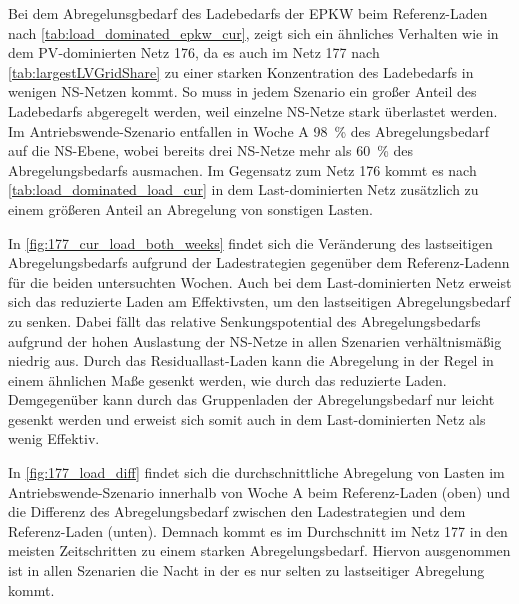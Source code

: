 



Bei dem Abregelunsgbedarf des Ladebedarfs der \gls{EPKW} beim Referenz-Laden nach \autoref{tab:load_dominated_epkw_cur}, zeigt sich ein ähnliches Verhalten wie in dem \gls{PV}-dominierten Netz \num{176}, da es auch im Netz \num{177} nach \autoref{tab:largestLVGridShare} zu einer starken Konzentration des Ladebedarfs in wenigen \gls{NS}-Netzen kommt.
So muss in jedem Szenario ein großer Anteil des Ladebedarfs abgeregelt werden, weil einzelne \gls{NS}-Netze stark überlastet werden.
Im Antriebswende-Szenario entfallen in Woche A \SI{98}{\percent} des Abregelungsbedarf auf die \gls{NS}-Ebene, wobei bereits drei \gls{NS}-Netze mehr als \SI{60}{\percent} des Abregelungsbedarfs ausmachen.
Im Gegensatz zum Netz \num{176} kommt es nach \autoref{tab:load_dominated_load_cur} in dem Last-dominierten Netz zusätzlich zu einem größeren Anteil an Abregelung von sonstigen Lasten.





In \autoref{fig:177_cur_load_both_weeks} findet sich die Veränderung des lastseitigen Abregelungsbedarfs aufgrund der Ladestrategien gegenüber dem Referenz-Ladenn für die beiden untersuchten Wochen.
Auch bei dem Last-dominierten Netz erweist sich das reduzierte Laden am Effektivsten, um den lastseitigen Abregelungsbedarf zu senken.
Dabei fällt das relative Senkungspotential des Abregelungsbedarfs aufgrund der hohen Auslastung der \gls{NS}-Netze in allen Szenarien verhältnismäßig niedrig aus.
Durch das Residuallast-Laden kann die Abregelung in der Regel in einem ähnlichen Maße gesenkt werden, wie durch das reduzierte Laden.
Demgegenüber kann durch das Gruppenladen der Abregelungsbedarf nur leicht gesenkt werden und erweist sich somit auch in dem Last-dominierten Netz als wenig Effektiv.



In \autoref{fig:177_load_diff} findet sich die durchschnittliche Abregelung von Lasten im Antriebswende-Szenario innerhalb von Woche A beim Referenz-Laden (oben) und die Differenz des Abregelungsbedarf zwischen den Ladestrategien und dem Referenz-Laden (unten).
Demnach kommt es im Durchschnitt im Netz \num{177} in den meisten Zeitschritten zu einem starken Abregelungsbedarf.
Hiervon ausgenommen ist in allen Szenarien die Nacht in der es nur selten zu lastseitiger Abregelung kommt.\medskip

